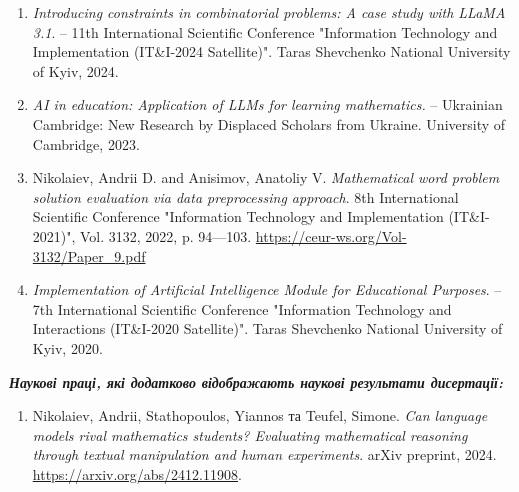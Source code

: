 \begin{enumerate}
    \item \textit{Introducing constraints in combinatorial problems: A case study with LLaMA 3.1}. -- 11th International Scientific Conference "Information Technology and Implementation (IT\&I-2024 Satellite)". Taras Shevchenko National University of Kyiv, 2024.
    \item \textit{AI in education: Application of LLMs for learning mathematics.} -- Ukrainian Cambridge: New Research by Displaced Scholars from Ukraine. University of Cambridge, 2023.
    \item Nikolaiev, Andrii D. and Anisimov, Anatoliy V. \textit{Mathematical word problem solution evaluation via data preprocessing approach}. 8th International Scientific Conference "Information Technology and Implementation (IT\&I-2021)", Vol. 3132, 2022, p. 94—103. \url{https://ceur-ws.org/Vol-3132/Paper_9.pdf} %
    \item \textit{Implementation of Artificial Intelligence Module for Educational Purposes}. -- 7th International Scientific Conference "Information Technology and Interactions (IT\&I-2020 Satellite)". Taras Shevchenko National University of Kyiv, 2020.
\end{enumerate}

\medskip
\textit{\textbf{Наукові праці, які додатково відображають наукові результати дисертації:}}
\medskip
\begin{enumerate}
    \item Nikolaiev, Andrii, Stathopoulos, Yiannos та Teufel, Simone. \textit{Can language models rival mathematics students? Evaluating mathematical reasoning through textual manipulation and human experiments}. arXiv preprint, 2024. \url{https://arxiv.org/abs/2412.11908}.
\end{enumerate}
